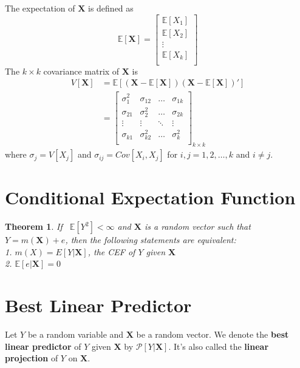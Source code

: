 \documentclass[
]{book}
\newtheorem{theorem}{Theorem}[chapter]
\theoremstyle{definition}
\theoremstyle{definition}
\theoremstyle{definition}
\theoremstyle{definition}
\theoremstyle{remark}
\begin{document}
The expectation of \(\pmb{X}\) is defined as
\[
\mathbb{E}[\pmb{X}]=
\begin{bmatrix}
\mathbb{E}[X_1] \\
\mathbb{E}[X_2] \\
\vdots \\
\mathbb{E}[X_k] \\
\end{bmatrix}
\]
The \(k\times k\) covariance matrix of \(\pmb{X}\) is
\begin{align}
V[\pmb{X}] &=\mathbb{E}[(\pmb{X}-\mathbb{E}[\pmb{X}])(\pmb{X}-\mathbb{E}[\pmb{X}])'] \\
&=\begin{bmatrix}
\sigma_1^2 & \sigma_{12} & \ldots & \sigma_{1k} \\
\sigma_{21} & \sigma_{2}^2 & \ldots & \sigma_{2k} \\
\vdots & \vdots & \ddots & \vdots \\
\sigma_{k1} & \sigma_{k2}^2 & \ldots & \sigma_{k}^2 \\
\end{bmatrix}_{k\times k}
\end{align}
where \(\sigma_j=V[X_j]\) and \(\sigma_{ij}=Cov[X_i,X_j]\) for \(i,j=1,2,\ldots,k\) and \(i\neq j\).

\hypertarget{conditional-expectation-function}{%
\section{Conditional Expectation Function}\label{conditional-expectation-function}}

\begin{theorem}
If ~\({\mathbb{E}\left[ Y^2 \right]}<\infty\) and \(\pmb{X}\) is a random vector such that \(Y=m(\pmb{X})+e\), then the following statements are equivalent:\\
1. \(m(X)=E[Y|\pmb{X}]\), the CEF of \(Y\) given \(\pmb{X}\)\\
2. \({\mathbb{E}\left[ e|\pmb{X} \right]}=0\)
\end{theorem}

\hypertarget{best-linear-predictor}{%
\section{Best Linear Predictor}\label{best-linear-predictor}}

Let \(Y\) be a random variable and \(\pmb{X}\) be a random vector. We denote the \textbf{best linear predictor} of \(Y\) given \(\pmb{X}\) by \(\mathscr{P}[Y|\pmb{X}]\). It's also called the \textbf{linear projection} of \(Y\) on \(\pmb{X}\).
\end{document}
